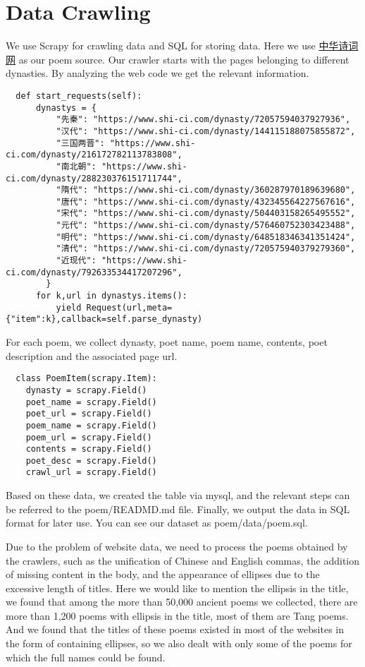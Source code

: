 \section{Data Crawling} \label{sec:crawl}

We use Scrapy for crawling data and SQL for storing data. Here we use \href{https://www.shi-ci.com/}{中华诗词网} as our poem source.
Our crawler starts with the pages belonging to different dynasties. By analyzing the web code we get the relevant information.
\begin{lstlisting}
  def start_requests(self):
      dynastys = {
          "先秦": "https://www.shi-ci.com/dynasty/72057594037927936", 
          "汉代": "https://www.shi-ci.com/dynasty/144115188075855872", 
          "三国两晋": "https://www.shi-ci.com/dynasty/216172782113783808", 
          "南北朝": "https://www.shi-ci.com/dynasty/288230376151711744", 
          "隋代": "https://www.shi-ci.com/dynasty/360287970189639680", 
          "唐代": "https://www.shi-ci.com/dynasty/432345564227567616",
          "宋代": "https://www.shi-ci.com/dynasty/504403158265495552", 
          "元代": "https://www.shi-ci.com/dynasty/576460752303423488", 
          "明代": "https://www.shi-ci.com/dynasty/648518346341351424",
          "清代": "https://www.shi-ci.com/dynasty/720575940379279360", 
          "近现代": "https://www.shi-ci.com/dynasty/792633534417207296",
        }
      for k,url in dynastys.items():
          yield Request(url,meta={"item":k},callback=self.parse_dynasty)
\end{lstlisting}

For each poem, we collect dynasty, poet name, poem name, contents, poet description and the associated page url.
\begin{lstlisting}
  class PoemItem(scrapy.Item):
    dynasty = scrapy.Field()
    poet_name = scrapy.Field()
    poet_url = scrapy.Field()
    poem_name = scrapy.Field()
    poem_url = scrapy.Field()
    contents = scrapy.Field()
    poet_desc = scrapy.Field()
    crawl_url = scrapy.Field()
\end{lstlisting}

Based on these data, we created the table via mysql, and the relevant steps can be referred to the poem/READMD.md file. Finally, we output the data in SQL format for later use. You can see our dataset as poem/data/poem.sql.

Due to the problem of website data, we need to process the poems obtained by the crawlers, such as the unification of Chinese and English commas, the addition of missing content in the body, and the appearance of ellipses due to the excessive length of titles. Here we would like to mention the ellipsis in the title, we found that among the more than 50,000 ancient poems we collected, there are more than 1,200 poems with ellipsis in the title, most of them are Tang poems. And we found that the titles of these poems existed in most of the websites in the form of containing ellipses, so we also dealt with only some of the poems for which the full names could be found.
